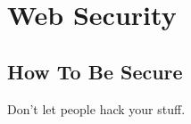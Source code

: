\section{Web Security}

\subsection{How To Be Secure}
\label{securitytips}

Don't let people hack your stuff. \needcite
